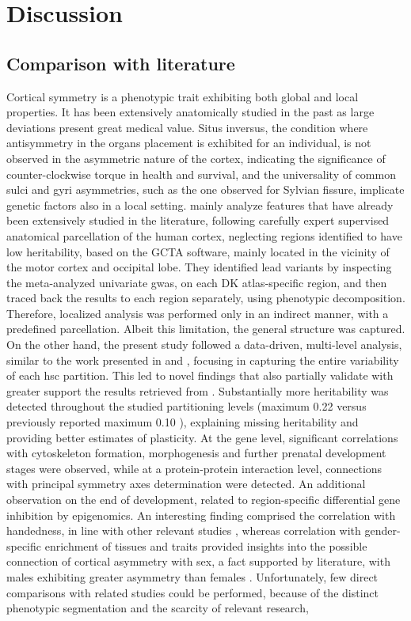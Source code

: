 \chapter{Discussion}\label{chap:discussion}

\section{Comparison with literature}
Cortical symmetry is a phenotypic trait exhibiting both global and local properties. It has been extensively anatomically studied in the past as large deviations present great medical value. Situs inversus, the condition where antisymmetry in the organs placement is exhibited for an individual, is not observed in the asymmetric nature of the cortex, indicating the significance of counter-clockwise torque in health and survival, and the universality of common sulci and gyri asymmetries, such as the one observed for Sylvian fissure, implicate genetic factors also in a local setting.  \citet{Sha2021} mainly analyze features that have already been extensively studied in the literature, following carefully expert supervised anatomical parcellation of the human cortex, neglecting regions identified to have low heritability, based on the GCTA software, mainly located in the vicinity of the motor cortex and occipital lobe. They identified lead variants by inspecting the meta-analyzed univariate \ac{gwas}, on each DK atlas-specific region, and then traced back the results to each region separately, using phenotypic decomposition\cite{Lin2020}. Therefore, localized analysis was performed only in an indirect manner, with a predefined parcellation. Albeit this limitation, the general structure was captured.  On the other hand, the present study followed a data-driven, multi-level analysis, similar to the work presented in \cite{Naqvi2021} and \cite{Claes2018}, focusing in capturing the entire variability of each  \ac{hsc} partition. This led to novel findings that also partially validate with greater support the results retrieved from \citet{Sha2021}. Substantially more heritability was detected throughout the studied partitioning levels (maximum 0.22 versus previously reported maximum 0.10 \cite{Sha2021}), explaining missing heritability and providing better estimates of plasticity. At the gene level, significant correlations with cytoskeleton formation, morphogenesis and further prenatal development stages were observed, while at a protein-protein interaction level, connections with principal symmetry axes determination were detected. An additional observation on the end of development, related to region-specific differential gene inhibition by epigenomics. An interesting finding comprised the correlation with handedness, in line with other relevant studies \citet{Kong2021}, whereas correlation with gender-specific enrichment of tissues and traits provided insights into the possible connection of cortical asymmetry with sex, a fact supported by literature, with males exhibiting greater asymmetry than females \cite{Guadalupe2015}. Unfortunately, few direct comparisons with related studies could be performed,  because of the distinct phenotypic segmentation and the scarcity of relevant research, 